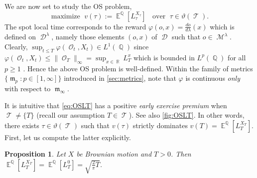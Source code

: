 \documentclass[11pt]{article}
\theoremstyle{plain}
\newtheorem{proposition}{Proposition}
\theoremstyle{definition}
\DeclareMathOperator{\E}{\mathbb{E}}
\DeclareMathOperator{\Q}{\mathbb{Q}}
\DeclareMathOperator{\R}{\mathbb{R}}
\DeclareMathOperator{\calD}{\mathcal{D}}
\DeclareMathOperator{\calM}{\mathcal{M}}
\DeclareMathOperator{\calO}{\mathcal{O}}
\DeclareMathOperator{\calT}{\mathcal{T}}
\DeclareMathOperator{\frakm}{\mathfrak{m}}
\begin{document}
We are now set to study  the OS problem, 
\begin{equation}\label{eq:OSLT}
  \text{maximize } \;  v(\tau) := \E^{\Q}[L_{\tau}^{X_\tau}] \;\; \text{ over } \;\tau \in \vartheta(\calT).  
\end{equation}
The spot local time   corresponds to the reward $\varphi(o,x) = \frac{do}{d\lambda}(x)$ which is defined on $\calD^{\lambda}$, namely those elements $(o,x)$ of $ \calD$ such that $o\in \calM^{\lambda}$. Clearly,  $\sup_{t\le T} \varphi(\calO_t,X_t) \in L^1(\Q)$ since  $\varphi(\calO_t,X_t) \le \lVert \calO_T \rVert_{\infty} =  \sup_{x\in \R} L_T^{x} $ which is bounded in $L^p(\Q)$ for all $p\ge 1$ \cite{BarlowYor}. Hence the above OS  problem is well-defined. %
Within the family of metrics $\{\frakm_p :  p \in [1,\infty]\}$ introduced in \cref{sec:metrics},  note that  $\varphi$ is continuous \textit{only} with respect to $\frakm_{\infty}$. 

It is intuitive that \eqref{eq:OSLT} has a positive \textit{early exercise premium} when $\calT \ne \{T\}$ (recall our assumption $T\in \calT$). See also \cref{fig:OSLT}. 
In other words, there exists  $\tau \in \vartheta(\calT)$ such that $v(\tau) $ strictly dominates %
$v(T)=\E^{\Q}[L_T^{X_T}]$. 
First, let us compute %
the latter
explicitly. %


 
\begin{proposition} \label{prop:EUPrice}%
Let $X$ be Brownian motion and  $T>0$. Then  $\E^{\Q}[L_T^{X_T}] = \E^{\Q}[L_T^{0}]  = \sqrt{\frac{2}{\pi}T}$.
\end{proposition}
\end{document}
